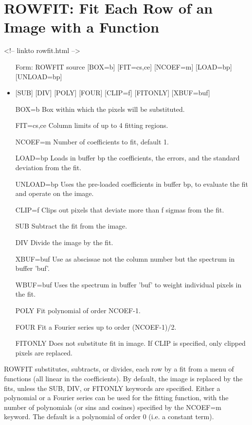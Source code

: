 \section{ROWFIT: Fit Each Row of an Image with a Function}
\begin{rawhtml}
<!-- linkto rowfit.html -->
\end{rawhtml}
\begin{itemize}
  \item[Form: ROWFIT source {[BOX=b]} {[FIT=cs,ce]} {[NCOEF=m]} {[LOAD=bp]} 
       {[UNLOAD=bp]}\hfill]{}
  \item{{[SUB]} {[DIV]} {[POLY]} {[FOUR]} {[CLIP=f]} {[FITONLY]} {[XBUF=buf]}}
  \item[BOX=b]{Box within which the pixels will be substituted.}
  \item[FIT=cs,ce]{Column limits of up to 4 fitting regions.}
  \item[NCOEF=m]{Number of coefficients to fit, default 1.}
  \item[LOAD=bp]{Loads in buffer bp the coefficients, the errors,
       and the standard deviation from the fit.}
  \item[UNLOAD=bp]{Uses the pre-loaded coefficients in buffer bp,  
       to evaluate the fit and operate on the image.}
  \item[CLIP=f]{Clips out pixels that deviate more than f sigmas from
       the fit.}
  \item[SUB]{Subtract the fit from the image.}
  \item[DIV]{Divide the image by the fit.}
  \item[XBUF=buf]{Use as abscissae not the column number but the spectrum  
       in buffer 'buf'.}
  \item[WBUF=buf]{Uses the spectrum in buffer 'buf' to weight individual
   pixels in the fit.}
  \item[POLY]{Fit polynomial of order NCOEF-1.}
  \item[FOUR]{Fit a Fourier series up to order (NCOEF-1)/2.}
  \item[FITONLY]{Does not substitute fit in image. If CLIP is specified,
       only clipped pixels are replaced.}
\end{itemize}

ROWFIT substitutes, subtracts, or divides, each row by a fit from a menu
of functions (all linear in the coefficients). By default, the image is
replaced by the fits, unless the SUB, DIV, or FITONLY keywords are
specified.  Either a polynomial or a Fourier series can be used for the
fitting function, with the number of polynomials (or sins and cosines)
specified by the NCOEF=m keyword. The default is a polynomial of order 0
(i.e. a constant term).

